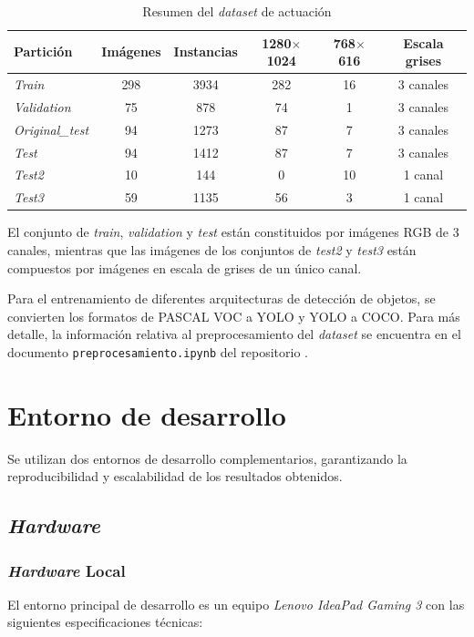 \documentclass[12pt,a4paper,onecolumn,oneside]{report}
\begin{document}
\begin{table}[htbp]
\caption{Resumen del \textit{dataset} de actuación}
\centering
{}
\begin{tabular}{l c c c c c}
\toprule
\textbf{Partición} & \textbf{Imágenes} & \textbf{Instancias} & \textbf{1280$\times$1024} & \textbf{768$\times$616} & \textbf{Escala grises}\\
\midrule
\textit{Train}          & 298 & 3934 & 282 & 16 & 3 canales\\
\textit{Validation}     &  75 &  878 & 74  & 1  & 3 canales\\
\textit{Original\_test} &  94 & 1273 & 87  & 7  & 3 canales\\
\textit{Test}           &  94 & 1412 & 87  & 7  & 3 canales\\
\textit{Test2}          &  10 &  144 & 0   & 10 & 1 canal\\
\textit{Test3}          &  59 & 1135 & 56  & 3  & 1 canal\\
\bottomrule
\end{tabular}
\label{tab:dataset_final}
\end{table}

El conjunto de \textit{train}, \textit{validation} y \textit{test} están constituidos por imágenes RGB de 3 canales, mientras que las imágenes 
de los conjuntos de \textit{test2} y \textit{test3} están compuestos por imágenes en escala de grises de un único canal. 

Para el entrenamiento de diferentes arquitecturas de detección de objetos, se convierten los formatos de PASCAL VOC a YOLO y YOLO a COCO. 
Para más detalle, la información relativa al preprocesamiento del \textit{dataset} se encuentra en el documento \texttt{preprocesamiento.ipynb} del repositorio \cite{repoTFM}.

\section{Entorno de desarrollo}
\label{sec:Entorno de desarrollo}
Se utilizan dos entornos de desarrollo complementarios, garantizando la reproducibilidad y escalabilidad de los resultados obtenidos.

\subsection{\textit{Hardware}}
\subsubsection{\textit{Hardware} Local}
\label{sec:hardware_local}
El entorno principal de desarrollo es un equipo \textit{Lenovo IdeaPad Gaming 3} con las siguientes especificaciones técnicas:
\end{document}
